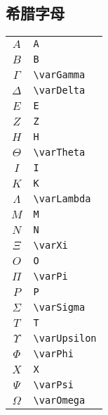 \subsection{希腊字母}
\begin{table}[h]
	\centering
	\begin{minipage}[t]{0.28\textwidth}
		\centering
		\begin{tabular}{c l}
			\hline
			$A$           & \verb|A|                         \\
			$B$           & \verb|B|                         \\
			$\varGamma$   & {\color{blue}\verb|\varGamma|}   \\
			$\varDelta$   & {\color{blue}\verb|\varDelta|}   \\
			$E$           & \verb|E|                         \\
			$Z$           & \verb|Z|                         \\
			$H$           & \verb|H|                         \\
			$\varTheta$   & {\color{blue}\verb|\varTheta|}   \\
			$I$           & \verb|I|                         \\
			$K$           & \verb|K|                         \\
			$\varLambda$  & {\color{blue}\verb|\varLambda|}  \\
			$M$           & \verb|M|                         \\
			$N$           & \verb|N|                         \\
			$\varXi$      & {\color{blue}\verb|\varXi|}      \\
			$O$           & \verb|O|                         \\
			$\varPi$      & {\color{blue}\verb|\varPi|}      \\
			$P$           & \verb|P|                         \\
			$\varSigma$   & {\color{blue}\verb|\varSigma|}   \\
			$T$           & \verb|T|                         \\
			$\varUpsilon$ & {\color{blue}\verb|\varUpsilon|} \\
			$\varPhi$     & {\color{blue}\verb|\varPhi|}     \\
			$X$           & \verb|X|                         \\
			$\varPsi$     & {\color{blue}\verb|\varPsi|}     \\
			$\varOmega$   & {\color{blue}\verb|\varOmega|}   \\

\end{tabular}
\end{minipage}
\end{table}
